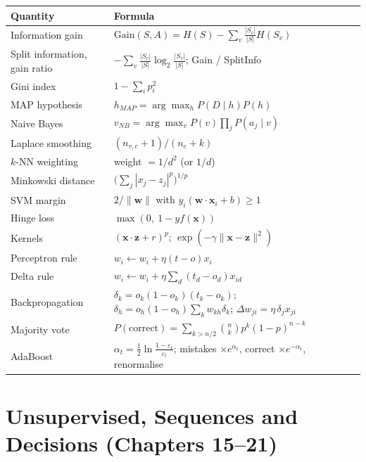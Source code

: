 \begin{longtable}{@{}L{4.0cm}L{11.0cm}@{}}
\toprule
{}
\textbf{Quantity} & \textbf{Formula} \\
\midrule
\endhead
Information gain & $\text{Gain}(S, A) = H(S) - \sum_v \frac{|S_v|}{|S|}H(S_v)$ \\
Split information, gain ratio & $-\sum_v \frac{|S_v|}{|S|}\log_2\frac{|S_v|}{|S|}$; \quad Gain / SplitInfo \\
Gini index & $1 - \sum_i p_i^2$ \\
MAP hypothesis & $h_{MAP} = \arg\max_h P(D \mid h)P(h)$ \\
Naive Bayes & $v_{NB} = \arg\max_v P(v)\prod_j P(a_j \mid v)$ \\
Laplace smoothing & $(n_{v,c} + 1)/(n_c + k)$ \\
$k$-NN weighting & weight $= 1/d^2$ (or $1/d$) \\
Minkowski distance & $\big(\sum_j |x_j - z_j|^p\big)^{1/p}$ \\
SVM margin & $2/\|\mathbf{w}\|$ with $y_i(\mathbf{w}\cdot\mathbf{x}_i + b) \ge 1$ \\
Hinge loss & $\max(0,\ 1 - y f(\mathbf{x}))$ \\
Kernels & $(\mathbf{x}\cdot\mathbf{z} + r)^p$; \quad $\exp(-\gamma\|\mathbf{x} - \mathbf{z}\|^2)$ \\
Perceptron rule & $w_i \leftarrow w_i + \eta(t - o)x_i$ \\
Delta rule & $w_i \leftarrow w_i + \eta\sum_d(t_d - o_d)x_{id}$ \\
Backpropagation & $\delta_k = o_k(1 - o_k)(t_k - o_k)$; \quad $\delta_h = o_h(1 - o_h)\sum_k w_{kh}\delta_k$; \quad $\Delta w_{ji} = \eta\,\delta_j x_{ji}$ \\
Majority vote & $P(\text{correct}) = \sum_{k > n/2}\binom{n}{k}p^k(1 - p)^{n - k}$ \\
AdaBoost & $\alpha_t = \tfrac{1}{2}\ln\frac{1 - \varepsilon_t}{\varepsilon_t}$; mistakes $\times e^{\alpha_t}$, correct $\times e^{-\alpha_t}$, renormalise \\
\bottomrule
\end{longtable}

\section{Unsupervised, Sequences and Decisions (Chapters 15--21)}

